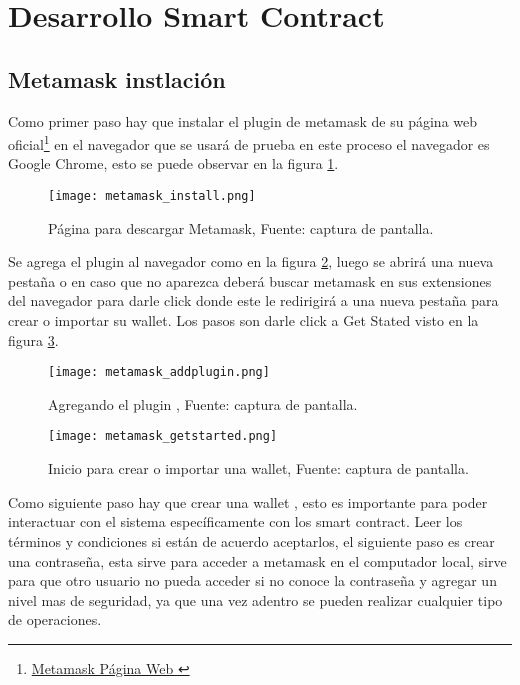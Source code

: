     
    



\section{Desarrollo Smart Contract}

\subsection{Metamask instlación}

Como primer paso hay que instalar el plugin de metamask de su  página web oficial\footnote{\href{https://metamask.io/download.html}{Metamask Página Web }} en el navegador que se usará de prueba en este proceso el navegador es  Google Chrome, 
esto se puede observar en la figura \ref{img:metamask_install}.
\begin{figure}[hbt!]
  \centering
  {\texttt{[image: metamask\_install.png]}}
  \caption{Página para descargar Metamask,  Fuente: captura de pantalla. }
  \label{img:metamask_install}
\end{figure}

Se agrega el plugin al navegador como en la figura \ref{img:metamask_add}, luego
se abrirá una nueva pestaña o en caso que no aparezca deberá buscar metamask en sus extensiones del navegador 
para darle click donde este le redirigirá a una nueva pestaña para crear o importar su wallet.
Los pasos son darle click a Get Stated visto en la figura \ref{img:metamask_getstarted}.



\begin{figure}[hbt!]
  \centering
  {\texttt{[image: metamask\_addplugin.png]}}
  \caption{Agregando el plugin , Fuente: captura de pantalla. }
  \label{img:metamask_add}
\end{figure}

\begin{figure}[hbt!]
  \centering
  {\texttt{[image: metamask\_getstarted.png]}}
  \caption{Inicio para crear o importar una wallet, Fuente: captura de pantalla. }
  \label{img:metamask_getstarted}
\end{figure}

Como siguiente paso hay que crear una wallet , esto es importante para poder interactuar con el sistema
específicamente con los smart contract. Leer los términos y condiciones si están de acuerdo aceptarlos,
el siguiente paso es crear una contraseña, esta sirve para acceder a metamask en el computador local, sirve para 
que otro usuario no pueda acceder si no conoce la contraseña y agregar un nivel mas de seguridad, ya que una vez 
adentro se pueden realizar cualquier tipo de operaciones.

